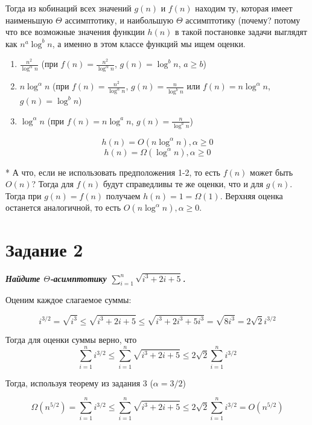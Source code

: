 \documentclass{article}
\begin{document}
\smallskip

Тогда из кобинаций всех значений $g(n)$ и $f(n)$ находим ту, которая имеет наименьшую $\Theta$ ассимптотику, и наибольшую $\Theta$ ассимптотику (почему? потому что все возможные значения функции $h(n)$ в такой постановке задачи выглядят как $n^a\log^bn$, а именно в этом классе функций мы ищем оценки. 

\smallskip

\begin{enumerate}
  \item $\frac{n^2}{\log^\alpha n}$ (при $f(n) = \frac{n^2}{\log^\alpha n}$, $g(n) = \log^bn$, $a \geq b$)
  
  \item $n\log^\alpha n$ (при $f(n) = \frac{n^2}{\log^\alpha n}$, $g(n) = \frac{n}{\log^b n}$ или $f(n) = n\log^\alpha n$, $g(n) = \log^bn$)
  
  \item  $\log^\alpha n$ (при $f(n) =n\log^an$, $g(n) = \frac{n}{\log^an}$)
\end{enumerate}

$$h(n) = O(n\log^\alpha n), \alpha \geq 0$$ 
$$h(n) = \Omega(\log^\alpha n), \alpha \geq 0$$

* А что, если не использовать предположения 1-2, то есть $f(n)$ может быть $O(n)$? Тогда для $f(n)$ будут справедливы те же оценки, что и для $g(n)$. Тогда при $g(n) = f(n)$ получаем $h(n) = 1 = \Omega(1)$. Верхняя оценка останется аналогичной, то есть $O(n\log^\alpha n), \alpha \geq 0$.

\section*{\textbf{Задание 2}}

\textbf{\textit{Найдите $\Theta$-асимптотику $\sum\limits_{i=1}^n \sqrt{i^3+2i+5}$.}}

Оценим каждое слагаемое суммы:

$$i^{3/2}= \sqrt{i^3} \leq \sqrt{i^3+2i+5} \leq \sqrt{i^3 + 2i^3 + 5i^3} = \sqrt{8i^3} = 2\sqrt{2}i^{3/2}$$

Тогда для оценки суммы верно, что 
$$\sum\limits_{i=1}^n i^{3/2} \leq \sum\limits_{i=1}^n \sqrt{i^3+2i+5} \leq 2\sqrt{2}\sum\limits_{i=1}^n i^{3/2}$$

Тогда, используя теорему из задания 3 ($\alpha = 3/2$)

$$\Omega(n^{5/2}) = \sum\limits_{i=1}^n i^{3/2} \leq \sum\limits_{i=1}^n \sqrt{i^3+2i+5} \leq 2\sqrt{2}\sum\limits_{i=1}^n i^{3/2} = O(n^{5/2})$$
\end{document}
